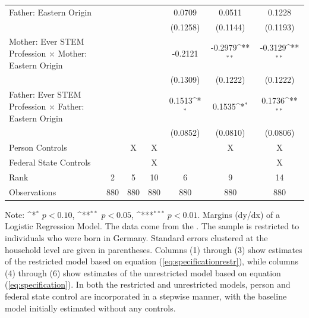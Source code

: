 \documentclass[a4paper, oneside, hyperfootnotes = false]{article}
\def\sym#1{\ifmmode^{#1}\else\(^{#1}\)\fi}
\begin{document}
{\begin{landscape}
\begin{table}[ht]
\begin{center}
{\begin{tabular}{l*{6}{c}}
				\addlinespace
				Father: Eastern Origin&                     &                     &                     &      0.0709         &      0.0511         &      0.1228         \\
				&                     &                     &                     &    (0.1258)         &    (0.1144)         &    (0.1193)         \\
				\addlinespace
				Mother: Ever STEM Profession $\times$ Mother: Eastern Origin&                     &                     &                     &     -0.2121         &     -0.2979\sym{**} &     -0.3129\sym{**} \\
				&                     &                     &                     &    (0.1309)         &    (0.1222)         &    (0.1222)         \\
				\addlinespace
				Father: Ever STEM Profession $\times$ Father: Eastern Origin&                     &                     &                     &      0.1513\sym{*}  &      0.1535\sym{*}  &      0.1736\sym{**} \\
				&                     &                     &                     &    (0.0852)         &    (0.0810)         &    (0.0806)         \\
				\midrule
				Person Controls & & X  & X & & X & X \\
				Federal State Controls & & & X & & & X \\
				Rank                &      2         &      5         &     10         &      6         &      9         &     14         \\
				Observations                   &    880         &    880         &    880         &    880         &    880         &    880         \\
				\bottomrule
			\end{tabular}}
			
			\vspace{2mm}
			
			\parbox{15cm}{
				\linespread{1}\footnotesize Note: \sym{*} \(p<0.10\), \sym{**} \(p<0.05\), \sym{***} \(p<0.01\). Margins (dy/dx) of a Logistic Regression Model. The data come from the \cite{SOEP2023}. The sample is restricted to individuals who were born in Germany. Standard errors clustered at the household level are given in parentheses. Columns (1) through (3) show estimates of the restricted model based on equation (\ref{eq:specificationrestr}), while columns (4) through (6) show estimates of the unrestricted model based on equation (\ref{eq:specification}). In both the restricted and unrestricted models, person and federal state control are incorporated in a stepwise manner, with the baseline model initially estimated without any controls.}
			

\end{center}
\end{table}
\end{landscape}}
\end{document}
